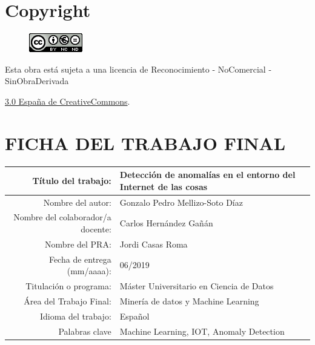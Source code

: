 \setcounter{page}{1} 
\pagestyle{plain}

\chapter*{Copyright}

\vspace{1cm}

\begin{figure}[ht]
    \centering
	\includegraphics[scale=1]{images/license.png}
\end{figure}

Esta obra está sujeta a una licencia de Reconocimiento -  NoComercial - SinObraDerivada

\href{https://creativecommons.org/licenses/by-nc-nd/3.0/es/}{3.0 España de CreativeCommons}.

\chapter*{FICHA DEL TRABAJO FINAL}

\begin{table}[ht]
	\centering{}
	\renewcommand{\arraystretch}{2}
	\begin{tabular}{r | l}
		\hline
		Título del trabajo: & Detección de anomalías en el entorno del Internet de las cosas\\
		\hline
        Nombre del autor: & Gonzalo Pedro Mellizo-Soto Díaz\\
		\hline
        Nombre del colaborador/a docente: & Carlos Hernández Gañán\\
		\hline
        Nombre del PRA: & Jordi Casas Roma\\
		\hline
        Fecha de entrega (mm/aaaa): & 06/2019\\
		\hline
        Titulación o programa: & Máster Universitario en Ciencia de Datos\\
		\hline
        Área del Trabajo Final: & Minería de datos y Machine Learning \\
		\hline
        Idioma del trabajo: & Español\\
		\hline
        Palabras clave & Machine Learning, IOT, Anomaly Detection\\
		\hline
	\end{tabular}
\end{table}

